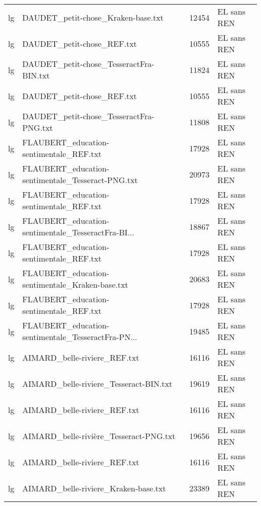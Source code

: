 \begin{tabular}{llrl}
    lg &                 DAUDET\_petit-chose\_Kraken-base.txt &                 12454 & EL sans REN \\
    lg &                         DAUDET\_petit-chose\_REF.txt &                 10555 & EL sans REN \\
    lg &            DAUDET\_petit-chose\_TesseractFra-BIN.txt &                 11824 & EL sans REN \\
    lg &                         DAUDET\_petit-chose\_REF.txt &                 10555 & EL sans REN \\
    lg &            DAUDET\_petit-chose\_TesseractFra-PNG.txt &                 11808 & EL sans REN \\
    lg &            FLAUBERT\_education-sentimentale\_REF.txt &                 17928 & EL sans REN \\
    lg &  FLAUBERT\_education-sentimentale\_Tesseract-PNG.txt &                 20973 & EL sans REN \\
    lg &            FLAUBERT\_education-sentimentale\_REF.txt &                 17928 & EL sans REN \\
    lg & FLAUBERT\_education-sentimentale\_TesseractFra-BI... &                 18867 & EL sans REN \\
    lg &            FLAUBERT\_education-sentimentale\_REF.txt &                 17928 & EL sans REN \\
    lg &    FLAUBERT\_education-sentimentale\_Kraken-base.txt &                 20683 & EL sans REN \\
    lg &            FLAUBERT\_education-sentimentale\_REF.txt &                 17928 & EL sans REN \\
    lg & FLAUBERT\_education-sentimentale\_TesseractFra-PN... &                 19485 & EL sans REN \\
    lg &                       AIMARD\_belle-riviere\_REF.txt &                 16116 & EL sans REN \\
    lg &             AIMARD\_belle-riviere\_Tesseract-BIN.txt &                 19619 & EL sans REN \\
    lg &                       AIMARD\_belle-riviere\_REF.txt &                 16116 & EL sans REN \\
    lg &             AIMARD\_belle-rivière\_Tesseract-PNG.txt &                 19656 & EL sans REN \\
    lg &                       AIMARD\_belle-riviere\_REF.txt &                 16116 & EL sans REN \\
    lg &               AIMARD\_belle-riviere\_Kraken-base.txt &                 23389 & EL sans REN \\

\end{tabular}
